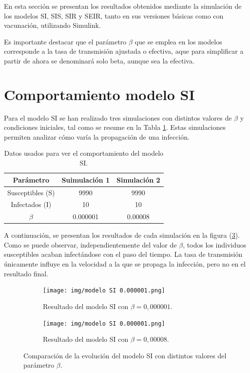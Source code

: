 En esta sección se presentan los resultados obtenidos mediante la simulación de los modelos SI, SIS, SIR y SEIR, tanto en sus versiones básicas como con vacunación, utilizando Simulink. 

Es importante destacar que el parámetro $\beta$ que se emplea en los modelos corresponde a la tasa de transmisión ajustada o efectiva, aque para simplificar a partir de ahora se denominará solo beta, aunque sea la efectiva.

\section{Comportamiento modelo SI}
Para el modelo SI se han realizado tres simulaciones con distintos valores de $\beta$ y condiciones iniciales, tal como se resume en la Tabla \ref{tab:resultadosSI}. Estas simulaciones permiten analizar cómo varía la propagación de una infección.
\begin{table}[H]
\centering
\begin{tabular}{|c|c|c|}
\hline
\textbf{Parámetro} & \textbf{Suimulación 1} & \textbf{Simulación 2}  \\
\hline
Susceptibles (S)  & 9990 & 9990 \\
\hline
Infectados (I)   & 10   & 10   \\
\hline
\(\beta\)       & 0.000001 & 0.00008 \\
\hline
\end{tabular}
\caption{Datos usados para ver el comportamiento del modelo SI.}
\label{tab:resultadosSI}
\end{table}
A continuación, se presentan los resultados de cada simulación en la figura (\ref{fig:comparacion_SI}).
Como se puede observar, independientemente del valor de $\beta$, todos los individuos susceptibles acaban infectándose con el paso del tiempo. La tasa de transmisión únicamente influye en la velocidad a la que se propaga la infección, pero no en el resultado final.


\begin{figure}[htbp]
    \centering
    \begin{subfigure}[b]{0.9\linewidth}
        \centering
        \texttt{[image: img/modelo SI 0.000001.png]}
        \caption{Resultado del modelo SI con $\beta = 0{,}000001$.}
        \label{fig:simulacion_2_SI}
    \end{subfigure}
    
    \vspace{0.5cm}
    
    \begin{subfigure}[b]{0.9\linewidth}
        \centering
        \texttt{[image: img/modelo SI 0.000001.png]}
        \caption{Resultado del modelo SI con $\beta = 0{,}00008$.}
        \label{fig:simulacion_3_SI}
    \end{subfigure}
    
    \caption{Comparación de la evolución del modelo SI con distintos valores del parámetro $\beta$.}
    \label{fig:comparacion_SI}
\end{figure}





